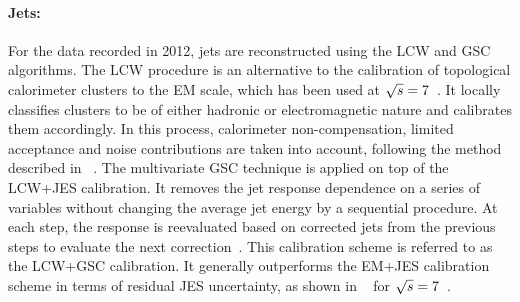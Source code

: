\paragraph{Jets:}\mbox{}
For the data recorded in 2012, jets are reconstructed using the \gls{LCW} and \gls{GSC} algorithms.
The \gls{LCW} procedure is an alternative to the calibration of topological calorimeter clusters to the \gls{EM} scale, which has been used at ${\sqrt{s}}=7$~\TeV. It locally classifies clusters to be of either hadronic or electromagnetic nature and calibrates them accordingly. In this process, calorimeter non-compensation, limited acceptance and noise contributions are taken into account, following the method described in ~\cite{Aad:1409965}.
The multivariate \gls{GSC} technique is applied on top of the \gls{LCW}+\gls{JES} calibration. It removes the jet response dependence on a series of variables without changing the average jet energy by a sequential procedure. At each step, the response is reevaluated based on corrected jets from the previous steps to evaluate the next correction~\cite{Aad:1409965}. 
%
This calibration scheme is referred to as the \gls{LCW}+\gls{GSC} calibration. It generally outperforms the \gls{EM}+\gls{JES} calibration scheme in terms of residual \gls{JES} uncertainty, as shown in ~\cite{ATLASCollaboration2015b} for ${\sqrt{s}}=7$~\TeV.
%
